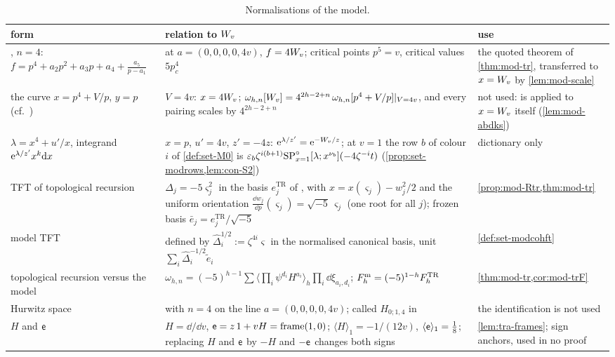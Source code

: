 \begin{table}[ht]
\caption{Normalisations of the model.}
\label{tab:sgn-model}
\centering
\footnotesize
\renewcommand{\arraystretch}{1.2}
\begin{tabular}{@{}>{\raggedright\arraybackslash}p{}>{\raggedright\arraybackslash}p{}>{\raggedright\arraybackslash}p{}@{}}
\hline
form & relation to $W_{v}$ & use \\
\hline
\cite[(8-1)]{Dunin-Barkowski:2015caa}, $n=4$: $f=p^4+a_2p^2+a_3p+a_4+\frac{a_5}{p-a_1}$ & at $a=(0,0,0,0,4v)$, $f=4W_{v}$; critical points $p^5=v$, critical values $5p_c^4$ & the quoted theorem of \cref{thm:mod-tr}, transferred to $x=W_{v}$ by \cref{lem:mod-scale} \\
the curve $x=p^4+V/p$, $y=p$ (cf.\ \cite[(7.2)]{ABDKS25}) & $V=4v$: $x=4W_{v}$; $\omega_{h,n}[W_{v}]=4^{2h-2+n}\,\omega_{h,n}[p^4+V/p]|_{V=4v}$, and every pairing scales by $4^{2h-2+n}$ & not used: \cite[Theorem~7.1]{ABDKS25} is applied to $x=W_{v}$ itself (\cref{lem:mod-abdks}) \\
$\lambda=x^4+u'/x$, integrand $\mathrm{e}^{\lambda/z'}x^k\mathrm{d} x$ & $x=p$, $u'=4v$, $z'=-4z$: $\mathrm{e}^{\lambda/z'}=\mathrm{e}^{-W_{v}/z}$; at $v=1$ the row $b$ of colour $i$ of \cref{def:set-M0} is $\varepsilon_b\zeta^{i(b+1)}\mathrm{SP}^{\circ}_{x=1}[\lambda;x^{\nu_b}](-4\zeta^{-i}t)$ (\cref{prop:set-modrows,lem:con-S2}) & dictionary only \\
TFT of topological recursion & $\Delta_j=-5\varsigma_j^2$ in the basis $e^{\mathrm{TR}}_j$ of \cite[(2-30)]{Dunin-Barkowski:2015caa}, with $x=x(\varsigma_j)-w_j^2/2$ and the uniform orientation $\frac{\dd w_j}{\dd p}(\varsigma_j)=\sqrt{-5}\,\varsigma_j$ (one root for all $j$); frozen basis $\bar e_j=e^{\mathrm{TR}}_j/\sqrt{-5}$ & \cref{prop:mod-Rtr,thm:mod-tr} \\
model TFT & defined by $\hat\Delta_i^{1/2}:=\zeta^{4i}\varsigma$ in the normalised canonical basis, unit $\sum_i\hat\Delta_i^{-1/2}\tilde e_i$ & \cref{def:set-modcohft} \\
topological recursion versus the model & $\omega_{h,n}=(-5)^{h-1}\sum\langle\prod_i\psi^{d_i}H^{a_i}\rangle_h\prod_i\dd\xi_{a_i,d_i}$; $F^{\mathrm{m}}_h=(-5)^{1-h}F^{\mathrm{TR}}_h$ & \cref{thm:mod-tr,cor:mod-trF} \\
Hurwitz space & \cite[(8-1)]{Dunin-Barkowski:2015caa} with $n=4$ on the line $a=(0,0,0,0,4v)$; called $H_{0;1,4}$ in \cite{CvdLPS23} & the identification is not used \\
$H$ and $\mathsf{e}$ & $H=\dd/\dd v$, $\mathsf{e}=z\,1+vH=\mathrm{frame}(1,0)$; $\langle H\rangle_1=-1/(12v)$, $\langle\mathsf{e}\rangle_1=\frac18$; replacing $H$ and $\mathsf{e}$ by $-H$ and $-\mathsf{e}$ changes both signs & \cref{lem:tra-frames}; sign anchors, used in no proof \\
\hline
\end{tabular}
\end{table}


